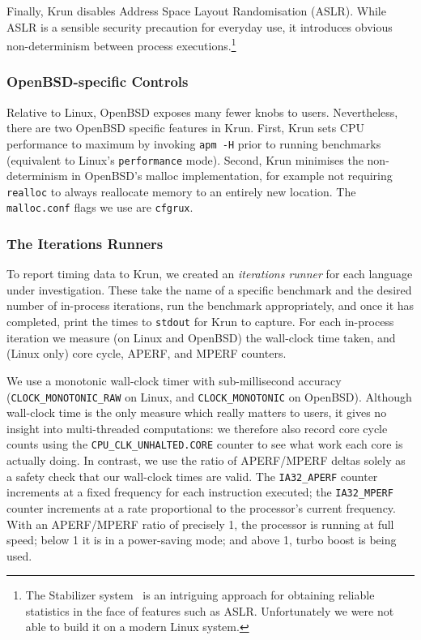\documentclass[preprint,numbers,10pt]{sigplanconf}
\newcommand{\krun}{Krun\xspace}
\begin{document}
Finally, \krun disables Address Space Layout Randomisation (ASLR). While ASLR is
a sensible security precaution for everyday use, it introduces obvious
non-determinism between process executions.\footnote{The Stabilizer
system~\cite{curtsinger13stabilizer} is an intriguing approach for obtaining reliable
statistics in the face of features such as ASLR. Unfortunately we were not able
to build it on a modern Linux system.}


\subsubsection{OpenBSD-specific Controls}

Relative to Linux, OpenBSD exposes many fewer knobs to users. Nevertheless,
there are two OpenBSD specific features in \krun.
First, \krun sets CPU performance to maximum by invoking \texttt{apm -H} prior
to running benchmarks (equivalent to Linux's \texttt{performance} mode).
Second, \krun minimises the non-determinism in OpenBSD's malloc implementation,
for example not requiring \texttt{realloc} to always reallocate memory to
an entirely new location. The \texttt{malloc.conf} flags we use are \texttt{cfgrux}.


\subsubsection{The Iterations Runners}

To report timing data to \krun, we created an
\emph{iterations runner} for each language under investigation.
These take the name of a specific benchmark and
the desired number of in-process iterations, run the benchmark appropriately,
and once it has completed, print the times to \texttt{stdout} for \krun to
capture. For each in-process iteration we
measure (on Linux and OpenBSD) the wall-clock time taken, and (Linux only) core
cycle, APERF, and MPERF counters.

We use a monotonic wall-clock timer with sub-millisec\-ond accuracy
(\texttt{CLOCK\_MONOTONIC\_RAW} on Linux, and \texttt{CLOCK\-\_MONOTONIC} on
OpenBSD). Although wall-clock time is the only measure which really matters to
users, it gives no insight into multi-threaded computations: we therefore also record
core cycle counts using the \texttt{CPU\-\_CLK\-\_UNHALTED\-.CORE} counter to see
what work each core is actually doing. In contrast, we use the ratio of APERF/MPERF deltas
solely as a safety check that our wall-clock times are valid.
The \texttt{IA32\_APERF} counter increments at a fixed
frequency for each instruction executed; the \texttt{IA32\_MPERF} counter increments at a rate
proportional to the processor's current frequency. With an APERF/MPERF ratio of
precisely 1, the processor is running at full speed; below 1 it is in
a power-saving mode; and above 1, turbo boost is being used.
\end{document}
